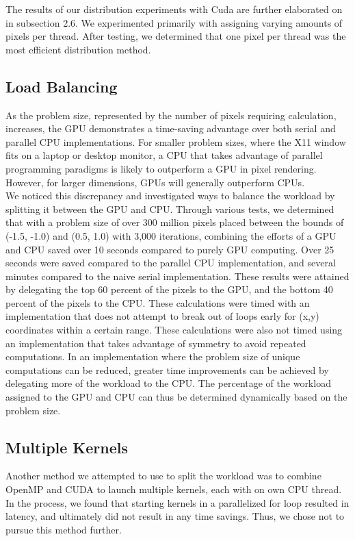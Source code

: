 \documentclass{article}
\begin{document}
The results of our distribution experiments with Cuda are further 
elaborated on in subsection 2.6. We experimented primarily with assigning 
varying amounts of pixels per thread. After testing, we determined that one
pixel per thread was the most efficient distribution method. 

\subsection{Load Balancing}

As the problem size, represented by the number of pixels requiring 
calculation, increases, the GPU demonstrates a time-saving advantage over 
both serial and parallel CPU implementations.
For smaller problem sizes, where the X11 window fits on a laptop or desktop
monitor, a CPU that takes advantage of parallel programming paradigms is 
likely to outperform a GPU in pixel rendering.
However, for larger dimensions, GPUs will generally outperform CPUs.\\

We noticed this discrepancy and investigated ways to balance the workload
by splitting it between the GPU and CPU.
Through various tests, we determined that with a problem size of over 300
million pixels placed between the bounds of (-1.5, -1.0) and (0.5, 1.0) 
with 3,000 iterations, combining the efforts of a GPU and CPU saved over 10
seconds compared to purely GPU computing.
Over 25 seconds were saved compared to the parallel CPU implementation, and
several minutes compared to the naive serial implementation.
These results were attained by delegating the top 60 percent of the pixels
to the GPU, and the bottom 40 percent of the pixels to the CPU.
These calculations were timed with an implementation that does not attempt
to break out of loops early for (x,y) coordinates within a certain range.
These calculations were also not timed using an implementation that takes 
advantage of symmetry to avoid repeated computations.
In an implementation where the problem size of unique computations can be
reduced, greater time improvements can be achieved by delegating more of 
the workload to the CPU.
The percentage of the workload assigned to the GPU and CPU can thus be 
determined dynamically based on the problem size.

\subsection{Multiple Kernels}

Another method we attempted to use to split the workload was to combine
OpenMP and CUDA to launch multiple kernels, each with on own CPU thread.
In the process, we found that starting kernels in a parallelized for loop 
resulted in latency, and ultimately did not result in any time savings.
Thus, we chose not to pursue this method further.
\end{document}
